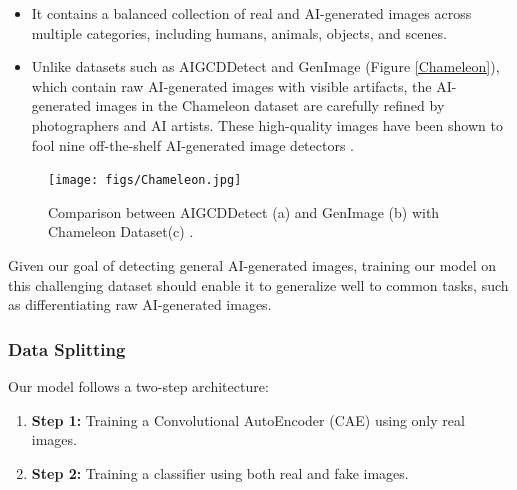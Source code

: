 \documentclass{article} %
\begin{document}
\begin{itemize}
    \item It contains a balanced collection of real and AI-generated images across multiple categories, including humans, animals, objects, and scenes.
    \item Unlike datasets such as AIGCDDetect and GenImage (Figure \ref{Chameleon}), which contain raw AI-generated images with visible artifacts, the AI-generated images in the Chameleon dataset are carefully refined by photographers and AI artists. These high-quality images have been shown to fool nine off-the-shelf AI-generated image detectors \citep{yan2024sanity}.
\end{itemize}

\begin{figure}[h]
    \centering
    \texttt{[image: figs/Chameleon.jpg]}
    \caption{Comparison between AIGCDDetect (a) and GenImage (b) with Chameleon Dataset(c) \citep{yan2024sanity}.}
    \label{fig:Chameleon}
\end{figure}

Given our goal of detecting general AI-generated images, training our model on this challenging dataset should enable it to generalize well to common tasks, such as differentiating raw AI-generated images.

\subsubsection{Data Splitting}
Our model follows a two-step architecture:
\begin{enumerate}
    \item \textbf{Step 1:} Training a Convolutional AutoEncoder (CAE) using only real images.
    \item \textbf{Step 2:} Training a classifier using both real and fake images.
\end{enumerate}
\end{document}
